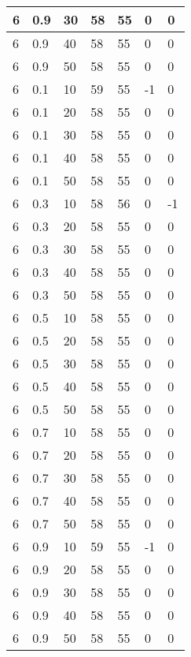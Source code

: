 \begin{longtable}{|l|l|l|l|l|l|l|}
		6     & 0.9 & 30   & 58 & 55 & 0   & 0   \\ \hline
		6     & 0.9 & 40   & 58 & 55 & 0   & 0   \\ \hline
		6     & 0.9 & 50   & 58 & 55 & 0   & 0   \\ \hline
		6     & 0.1 & 10   & 59 & 55 & -1  & 0   \\ \hline
		6     & 0.1 & 20   & 58 & 55 & 0   & 0   \\ \hline
		6     & 0.1 & 30   & 58 & 55 & 0   & 0   \\ \hline
		6     & 0.1 & 40   & 58 & 55 & 0   & 0   \\ \hline
		6     & 0.1 & 50   & 58 & 55 & 0   & 0   \\ \hline
		6     & 0.3 & 10   & 58 & 56 & 0   & -1  \\ \hline
		6     & 0.3 & 20   & 58 & 55 & 0   & 0   \\ \hline
		6     & 0.3 & 30   & 58 & 55 & 0   & 0   \\ \hline
		6     & 0.3 & 40   & 58 & 55 & 0   & 0   \\ \hline
		6     & 0.3 & 50   & 58 & 55 & 0   & 0   \\ \hline
		6     & 0.5 & 10   & 58 & 55 & 0   & 0   \\ \hline
		6     & 0.5 & 20   & 58 & 55 & 0   & 0   \\ \hline
		6     & 0.5 & 30   & 58 & 55 & 0   & 0   \\ \hline
		6     & 0.5 & 40   & 58 & 55 & 0   & 0   \\ \hline
		6     & 0.5 & 50   & 58 & 55 & 0   & 0   \\ \hline
		6     & 0.7 & 10   & 58 & 55 & 0   & 0   \\ \hline
		6     & 0.7 & 20   & 58 & 55 & 0   & 0   \\ \hline
		6     & 0.7 & 30   & 58 & 55 & 0   & 0   \\ \hline
		6     & 0.7 & 40   & 58 & 55 & 0   & 0   \\ \hline
		6     & 0.7 & 50   & 58 & 55 & 0   & 0   \\ \hline
		6     & 0.9 & 10   & 59 & 55 & -1  & 0   \\ \hline
		6     & 0.9 & 20   & 58 & 55 & 0   & 0   \\ \hline
		6     & 0.9 & 30   & 58 & 55 & 0   & 0   \\ \hline
		6     & 0.9 & 40   & 58 & 55 & 0   & 0   \\ \hline
		6     & 0.9 & 50   & 58 & 55 & 0   & 0   \\ \hline

\end{longtable}
